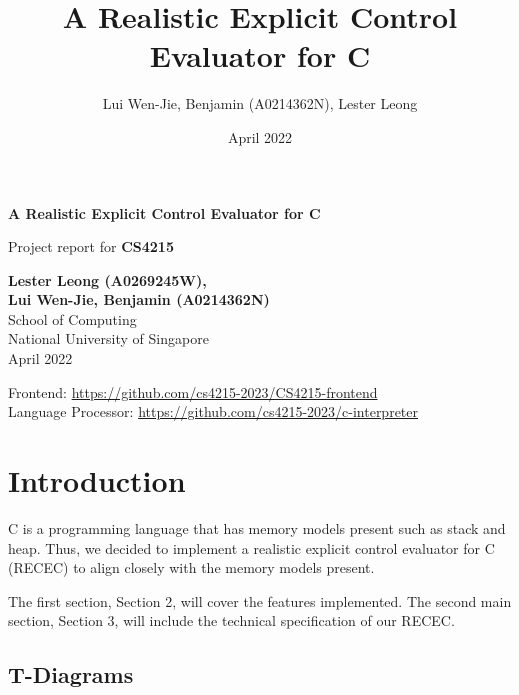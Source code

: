\documentclass[a4paper]{article}
\title{A Realistic Explicit Control Evaluator for C}
\author{Lui Wen-Jie, Benjamin (A0214362N), Lester Leong }
\date{April 2022}
\begin{document}

\begin{titlepage}
    \begin{center}
        \vspace*{1cm}

        \LARGE
        \textbf{A Realistic Explicit Control Evaluator for C}

        \vspace{0.5cm}        
		Project report for \textbf{CS4215}

        \vspace{3cm}

        \Large
        \textbf{Lester Leong (A0269245W), \\Lui Wen-Jie, Benjamin (A0214362N)}\\
        School of Computing\\
        National University of Singapore\\
        April 2022

		\vspace{3cm}
		\small
		Frontend: \url{https://github.com/cs4215-2023/CS4215-frontend} \\
		Language Processor: \url{https://github.com/cs4215-2023/c-interpreter}

		\vfill

    \end{center}
\end{titlepage}

\tableofcontents
\newpage

\section{Introduction}

C is a programming language that has memory models present such as stack and heap. Thus, we decided to implement a realistic explicit control evaluator for C (RECEC) to align closely with the memory models present. 

The first section, Section 2, will cover the features implemented. The second main section, Section 3, will include the technical specification of our RECEC.

\subsection{T-Diagrams}
\end{document}
